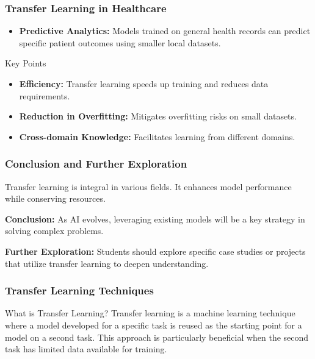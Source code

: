 \documentclass[aspectratio=169]{beamer}
\begin{document}
\begin{frame}[fragile]
    \frametitle{Transfer Learning in Healthcare}
    \begin{itemize}
        \item \textbf{Predictive Analytics:} Models trained on general health records can predict specific patient outcomes using smaller local datasets.
    \end{itemize}

    \begin{block}{Key Points}
        \begin{itemize}
            \item \textbf{Efficiency:} Transfer learning speeds up training and reduces data requirements.
            \item \textbf{Reduction in Overfitting:} Mitigates overfitting risks on small datasets.
            \item \textbf{Cross-domain Knowledge:} Facilitates learning from different domains.
        \end{itemize}
    \end{block}
\end{frame}

\begin{frame}[fragile]
    \frametitle{Conclusion and Further Exploration}
    Transfer learning is integral in various fields. It enhances model performance while conserving resources.
    
    \textbf{Conclusion:} As AI evolves, leveraging existing models will be a key strategy in solving complex problems.

    \textbf{Further Exploration:} Students should explore specific case studies or projects that utilize transfer learning to deepen understanding.
\end{frame}

\begin{frame}[fragile]
  \frametitle{Transfer Learning Techniques}
  \begin{block}{What is Transfer Learning?}
    Transfer learning is a machine learning technique where a model developed for a specific task is reused as the starting point for a model on a second task. This approach is particularly beneficial when the second task has limited data available for training.
  \end{block}
\end{frame}
\end{document}
